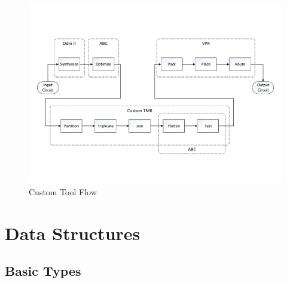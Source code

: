 \documentclass[12pt,final,oneside]{dwThesis} %
\begin{document}
   \begin{figure}

      \begin{center}

         \includegraphics[width=\linewidth]{images/CadFlowWPartitioner.pdf}
         \caption{Custom Tool Flow} \label{algToolflow} 
      \end{center}


   \end{figure}




   \section{Data Structures}
   \label{secDatastructures} 
   \subsection{Basic Types}
\end{document}

